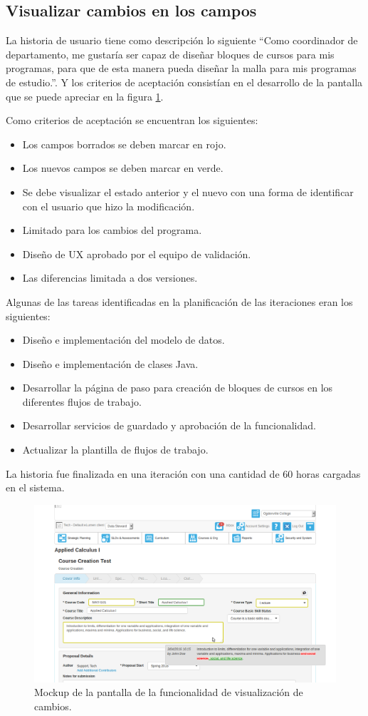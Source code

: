 \subsection{Visualizar cambios en los campos}
La historia de usuario tiene como descripción lo siguiente \enquote{Como coordinador de departamento, me gustaría ser capaz de diseñar bloques de cursos para mis programas, para que de esta manera pueda diseñar la malla para mis programas de estudio.}. Y los criterios de aceptación consistían en el desarrollo de la pantalla que se puede apreciar en la figura \ref{visualize_changes}.

Como criterios de aceptación se encuentran los siguientes:
\begin{itemize}
	\item Los campos borrados se deben marcar en rojo.
	\item Los nuevos campos se deben marcar en verde.
	\item Se debe visualizar el estado anterior y el nuevo con una forma de identificar con el usuario que hizo la modificación.
	\item Limitado para los cambios del programa.
	\item Diseño de UX aprobado por el equipo de validación.
	\item Las diferencias limitada a dos versiones.
\end{itemize}

Algunas de las tareas identificadas en la planificación de las iteraciones eran los siguientes:
\begin{itemize}
	\item Diseño e implementación del modelo de datos.
	\item Diseño e implementación de clases Java.
	\item Desarrollar la página de paso para creación de bloques de cursos en los diferentes flujos de trabajo.
	\item Desarrollar servicios de guardado y aprobación de la funcionalidad.
	\item Actualizar la plantilla de flujos de trabajo.
\end{itemize}

La historia fue finalizada en una iteración con una cantidad de 60 horas cargadas en el sistema.

\begin{figure}[H]
\centering
\includegraphics[width=125mm,scale=1]{Capitulos/DesarrollodelaAplicacion/Imagenes/visualize_changes}
\caption{Mockup de la pantalla de la funcionalidad de visualización de cambios.}
  \label{visualize_changes}
\end{figure}
